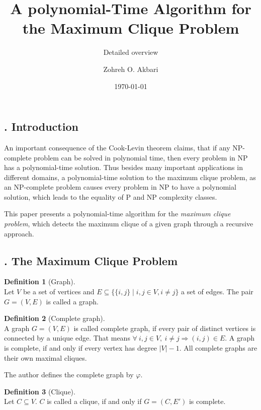\documentclass[12pt, xcolor=dvipsnames]{scrartcl}
\title{A polynomial-Time Algorithm for the Maximum Clique Problem}
\subtitle{Detailed overview}
\author{Zohreh O. Akbari}
\date{\today}
\theoremstyle{definition}
\newtheorem{definition}{Definition}%
\theoremstyle{definition}
\begin{document}
\maketitle

\newpage

\subsection*{. Introduction}
An important consequence of the Cook-Levin theorem claims, that if any NP-complete problem can be solved in polynomial time, then every problem in NP has a polynomial-time solution. Thus besides many important applications in different domains, a polynomial-time solution to the maximum clique problem, as an NP-complete problem causes every problem in NP to have a polynomial solution, which leads to the equality of P and NP complexity classes.

This paper presents a polynomial-time algorithm for the \textit{maximum clique problem}, which detects the maximum clique of a given graph through a recursive approach.

\subsection*{. The Maximum Clique Problem}

\begin{definition}[Graph]\ \\
    Let $V$ be a set of vertices and $E \subseteq \{ \{i,j\} \mid i,j \in V, i \neq j\}$ a set of edges. The pair $G = (V,E)$ is called a graph.
\end{definition}

\begin{definition}[Complete graph]\ \\
    A graph $G = (V,E)$ is called complete graph, if every pair of distinct vertices is connected by a unique edge. That means $\forall ~ i,j \in V,~ i \neq j \Longrightarrow (i,j) \in E$. A graph is complete, if and only if every vertex has degree $|V|-1$. All complete graphs are their own maximal cliques.
    
    The author defines the complete graph by $\varphi$.
\end{definition}

\begin{definition}[Clique]\ \\
    Let $C \subseteq V$. $C$ is called a clique, if and only if  $G = (C,E')$ is complete.
\end{definition}
\end{document}
